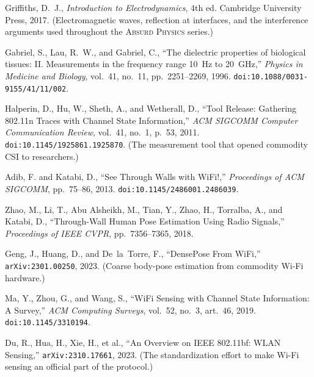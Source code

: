 \documentclass[11pt, letterpaper]{article}
\newcommand{\seriesname}{\textsc{Absurd Physics}}
\begin{document}
\begin{enumerate}[label={[\arabic*]}, leftmargin=*, itemsep=2pt]
  \item Griffiths, D.~J., \textit{Introduction to Electrodynamics}, 4th ed. Cambridge University Press, 2017. (Electromagnetic waves, reflection at interfaces, and the interference arguments used throughout the \seriesname{} series.)
  \item Gabriel, S., Lau, R.~W., and Gabriel, C., ``The dielectric properties of biological tissues: II. Measurements in the frequency range 10~Hz to 20~GHz,'' \textit{Physics in Medicine and Biology}, vol.~41, no.~11, pp.~2251--2269, 1996. \texttt{doi:10.1088/0031-9155/41/11/002}.
  \item Halperin, D., Hu, W., Sheth, A., and Wetherall, D., ``Tool Release: Gathering 802.11n Traces with Channel State Information,'' \textit{ACM SIGCOMM Computer Communication Review}, vol.~41, no.~1, p.~53, 2011. \texttt{doi:10.1145/1925861.1925870}. (The measurement tool that opened commodity CSI to researchers.)
  \item Adib, F. and Katabi, D., ``See Through Walls with WiFi!,'' \textit{Proceedings of ACM SIGCOMM}, pp.~75--86, 2013. \texttt{doi:10.1145/2486001.2486039}.
  \item Zhao, M., Li, T., Abu Alsheikh, M., Tian, Y., Zhao, H., Torralba, A., and Katabi, D., ``Through-Wall Human Pose Estimation Using Radio Signals,'' \textit{Proceedings of IEEE CVPR}, pp.~7356--7365, 2018.
  \item Geng, J., Huang, D., and De~la~Torre, F., ``DensePose From WiFi,'' \texttt{arXiv:2301.00250}, 2023. (Coarse body-pose estimation from commodity Wi-Fi hardware.)
  \item Ma, Y., Zhou, G., and Wang, S., ``WiFi Sensing with Channel State Information: A Survey,'' \textit{ACM Computing Surveys}, vol.~52, no.~3, art.~46, 2019. \texttt{doi:10.1145/3310194}.
  \item Du, R., Hua, H., Xie, H., et al., ``An Overview on IEEE 802.11bf: WLAN Sensing,'' \texttt{arXiv:2310.17661}, 2023. (The standardization effort to make Wi-Fi sensing an official part of the protocol.)
\end{enumerate}
\end{document}
